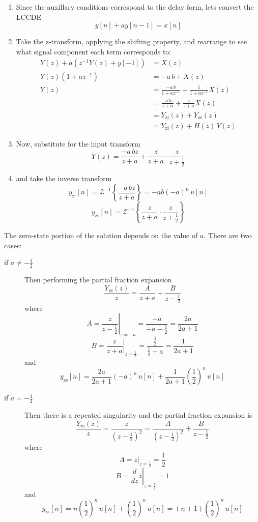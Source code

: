 \documentclass{article}
\begin{document}
\begin{enumerate}
\item Since the auxillary conditions correspond to the delay form, lets convert the LCCDE
  \[
  y[n] + ay[n-1] = x[n]
  \]
\item Take the z-transform, applying the shifting property, and rearrange to see what signal component each term corresponds to: 
  \begin{align*}
    Y(z) + a\left( z^{-1} Y(z) + y[-1]\right) &= X(z) \\
    Y(z)\left(1+az^{-1}\right) &= -a\, b + X(z)\\
    Y(z) &= \frac{-a\, b}{1+az^{-1}} + \frac{1}{1+az^{-1}} X(z)\\
    &= \frac{-a\, bz}{z+a} + \frac{z}{z+a} X(z)\\
    &= Y_{\mbox{zi}}(z) + Y_{\mbox{zs}}(z)\\
    &= Y_{\mbox{zi}}(z) + H(z)\, Y(z)
  \end{align*}
\item Now, substitute for the input transform
  \[
  Y(z) = \frac{-a\, bz}{z+a} + \frac{z}{z+a}\cdot \frac{z}{z+\frac{1}{2}}
  \]
\item and take the inverse transform
  \[
  y_{\mbox{zi}}[n] = \mathcal{Z}^{-1}\left\{ \frac{-a\, bz}{z+a}\right\} = -ab(-a)^n\, u[n] 
  \]
  \[
  y_{\mbox{zs}}[n] = \mathcal{Z}^{-1}\left\{ \frac{z}{z+a}\cdot \frac{z}{z+\frac{1}{2}} \right\}  
  \]
\end{enumerate}

The zero-state portion of the solution depends on the value of $a$. There are two cases:

\begin{description}
\item[if $a\neq -\frac{1}{2}$] Then performing the partial fraction expansion
  \[
  \frac{Y_{\mbox{zs}}(z)}{z} = \frac{A}{z+a} + \frac{B}{z-\frac{1}{2}} 
  \]
  where
  \[
  A = \left. \frac{z}{z - \frac{1}{2}}\right|_{z = -a} = \frac{-a}{-a - \frac{1}{2}} = \frac{2a}{2a+1} 
  \]
  \[
  B = \left. \frac{z}{z + a}\right|_{z = \frac{1}{2}} = \frac{\frac{1}{2}}{\frac{1}{2} + a} = \frac{1}{2a+1} 
  \]
  and
  \[
  y_{\mbox{zs}}[n] = \frac{2a}{2a+1} (-a)^n\, u[n] + \frac{1}{2a+1}\left(\frac{1}{2}\right)^n\, u[n]
  \]
\item[if $a = -\frac{1}{2}$] Then there is a repeated singularity and the partial fraction expansion is
  \[
  \frac{Y_{\mbox{zs}}(z)}{z} = \frac{z}{\left(z-\frac{1}{2}\right)^2} = \frac{A}{\left(z-\frac{1}{2}\right)^2} + \frac{B}{z-\frac{1}{2}}
  \]
  where
  \[
  A = \left. z \right|_{z = \frac{1}{2}} = \frac{1}{2} 
  \]
  \[
  B = \left. \frac{d}{dz} z \right|_{z = \frac{1}{2}} = 1 
  \]
  and
  \[
  y_{\mbox{zs}}[n] = n\left(\frac{1}{2}\right)^n\, u[n] + \left(\frac{1}{2}\right)^n\, u[n] = (n+1) \left(\frac{1}{2}\right)^n\, u[n] 
  \]
\end{description}
\end{document}

